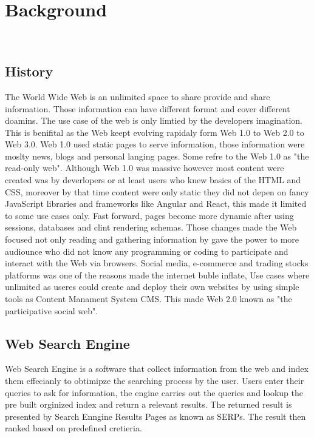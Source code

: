 \chapter{Background}\
\label{chap:background}
\section{History}

The World Wide Web is an unlimited space to share provide and share information. Those information can have different format and cover different doamins. The use case of the web is only limtied by the developers imagination. This is benifital as the Web keept evolving rapidaly form Web 1.0 to Web 2.0 to Web 3.0. Web 1.0 used static pages to serve information, those information were moslty news, blogs and personal langing pages. Some refre to the Web 1.0 as "the read-only web". Although Web 1.0 was massive however most content were created was by deverlopers or at least users who knew basics of the HTML and CSS, moreover by that time content were only static they did not depen on fancy JavaScript libraries and frameworks like Angular and React, this made it limited to some use cases only. Fast forward, pages become more dynamic after using sessions, databases and clint rendering schemas. Those changes made the Web focused not only reading and gathering information by gave the power to more audiounce who did not know any programming or coding to participate and interact with the Web via browsers. Social media, e-commerce and trading stocks platforms was one of the reasons made the internet buble inflate, Use cases where unlimited as useres could create and deploy their own websites by using simple tools as Content Manament System CMS. This made Web 2.0 known as "the participative social web".


\section{Web Search Engine}
Web Search Engine is a software that collect information from the web and index them effecianly to obtimipze the searching process by the user. Users enter their queries to ask for information, the engine carries out the queries and lookup the pre built orginized index and return a relevant results. The returned result is presented by Search Enngine Results Pages as known as SERPs. The result then ranked based on predefined cretieria. 

